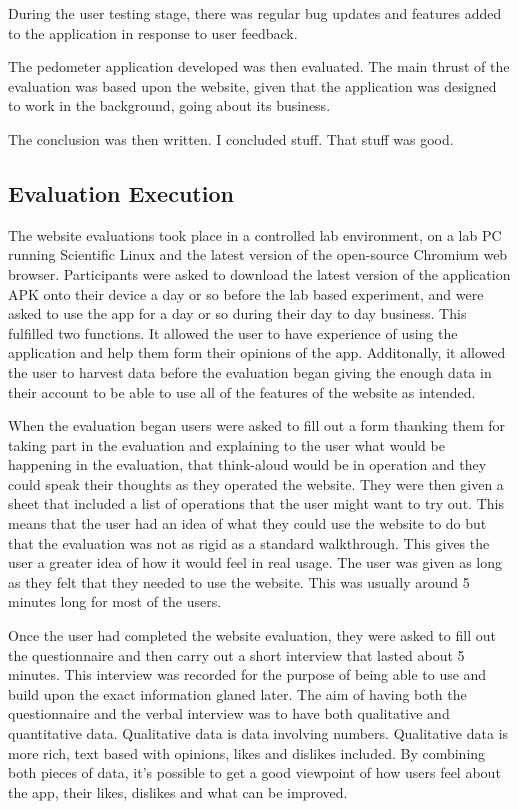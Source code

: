 \documentclass{l4proj}
\begin{document}
During the user testing stage, there was regular bug updates and features added to the application in response to user feedback.

The pedometer application developed was then evaluated. The main thrust of the evaluation was based upon the website, given that the application was designed to work in the background, going about its business.

The conclusion was then written. I concluded stuff. That stuff was good.

\subsection{Evaluation Execution}

The website evaluations took place in a controlled lab environment, on a lab PC running Scientific Linux and the latest version of the open-source Chromium web browser. Participants were asked to download the latest version of the application APK onto their device a day or so before the lab based experiment, and were asked to use the app for a day or so during their day to day business. This fulfilled two functions. It allowed the user to have experience of using the application and help them form their opinions of the app. Additonally, it allowed the user to harvest data before the evaluation began giving the enough data in their account to be able to use all of the features of the website as intended.

When the evaluation began users were asked to fill out a form thanking them for taking part in the evaluation and explaining to the user what would be happening in the evaluation, that think-aloud would be in operation and they could speak their thoughts as they operated the website. They were then given a sheet that included a list of operations that the user might want to try out. This means that the user had an idea of what they could use the website to do but that the evaluation was not as rigid as a standard walkthrough. This gives the user a greater idea of how it would feel in real usage. The user was given as long as they felt that they needed to use the website. This was usually around 5 minutes long for most of the users.

Once the user had completed the website evaluation, they were asked to fill out the questionnaire and then carry out a short interview that lasted about 5 minutes. This interview was recorded for the purpose of being able to use and build upon the exact information glaned later. The aim of having both the questionnaire and the verbal interview was to have both qualitative and quantitative data. Qualitative data is data involving numbers. Qualitative data is more rich, text based with opinions, likes and dislikes included. By combining both pieces of data, it's possible to get a good viewpoint of how users feel about the app, their likes, dislikes and what can be improved.
\end{document}
